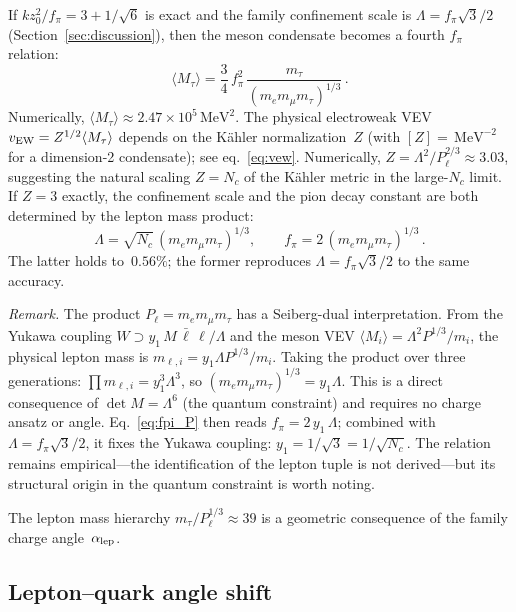 \documentclass[12pt,a4paper]{article}
\newcommand{\Nc}{N_c}
\newcommand{\MeV}{\,\mathrm{MeV}}
\begin{document}
If $kz_0^2/f_\pi = 3 + 1/\sqrt{6}$ is exact and the family confinement
scale is $\Lambda = f_\pi\sqrt{3}/2$ (Section~\ref{sec:discussion}),
then the meson condensate becomes a fourth $f_\pi$ relation:
\begin{equation}
  \langle M_\tau \rangle = \frac{3}{4}\,f_\pi^2\,
    \frac{m_\tau}{(m_e m_\mu m_\tau)^{1/3}}\,.
  \label{eq:Mtau_pred}
\end{equation}
Numerically, $\langle M_\tau\rangle \approx 2.47 \times 10^5\MeV^2$.
The physical electroweak VEV $v_{\rm EW} = Z^{1/2}\langle M_\tau\rangle$
depends on the K\"ahler normalization~$Z$ (with $[Z] = \MeV^{-2}$
for a dimension-2 condensate); see eq.~\eqref{eq:vew}. Numerically,
$Z = \Lambda^2/P_\ell^{2/3} \approx 3.03$, suggesting the natural
scaling $Z = \Nc$ of the K\"ahler metric in the large-$\Nc$
limit. If $Z = 3$ exactly, the confinement scale and the pion decay
constant are both determined by the lepton mass product:
\begin{equation}
  \Lambda = \sqrt{\Nc}\,(m_e m_\mu m_\tau)^{1/3}, \qquad
  f_\pi = 2\,(m_e m_\mu m_\tau)^{1/3}\,.
  \label{eq:fpi_P}
\end{equation}
The latter holds to~$0.56\%$; the former reproduces $\Lambda =
f_\pi\sqrt{3}/2$ to the same accuracy.

\emph{Remark.}
The product $P_\ell = m_e m_\mu m_\tau$ has a Seiberg-dual
interpretation.  From the Yukawa coupling $W \supset y_1\, M\,
\bar\ell\,\ell / \Lambda$ and the meson VEV $\langle M_i\rangle
= \Lambda^2 P^{1/3}/m_i$, the physical lepton mass is
$m_{\ell,i} = y_1 \Lambda P^{1/3}/m_i$.  Taking the product
over three generations:
$\prod m_{\ell,i} = y_1^3 \Lambda^3$, so
$(m_e m_\mu m_\tau)^{1/3} = y_1 \Lambda$.
This is a direct consequence of $\det M = \Lambda^6$ (the quantum
constraint) and requires no charge ansatz or angle.
Eq.~\eqref{eq:fpi_P} then reads $f_\pi = 2\,y_1\,\Lambda$;
combined with $\Lambda = f_\pi\sqrt{3}/2$, it fixes the Yukawa
coupling: $y_1 = 1/\sqrt{3} = 1/\sqrt{\Nc}$.  The relation
remains empirical---the identification of the lepton tuple is
not derived---but its structural origin in the quantum constraint
is worth noting.

The lepton mass hierarchy
$m_\tau/P_\ell^{1/3} \approx 39$ is a geometric consequence of
the family charge angle~$\alpha_{\rm lep}$.


\subsection{Lepton--quark angle shift}
\end{document}
